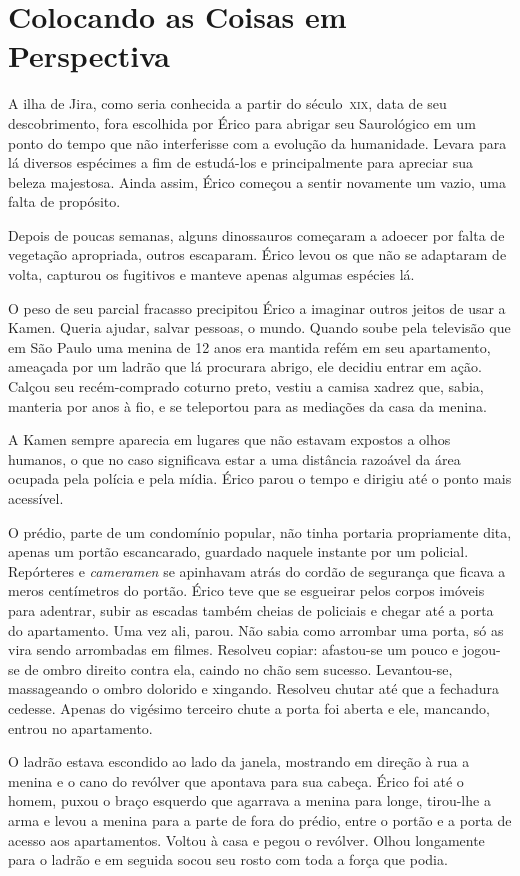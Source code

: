 \chapter{Colocando as Coisas em Perspectiva}

A ilha de Jira, como seria conhecida a partir do século~\textsc{xix}, data de
seu descobrimento, fora escolhida por Érico para abrigar seu Saurológico em um
ponto do tempo que não interferisse com a evolução da humanidade. Levara para
lá diversos espécimes a fim de estudá-los e principalmente para apreciar sua
beleza majestosa. Ainda assim, Érico começou a sentir novamente um vazio, uma
falta de propósito.

Depois de poucas semanas, alguns dinossauros começaram a adoecer por falta de
vegetação apropriada, outros escaparam. Érico levou os que não se adaptaram de
volta, capturou os fugitivos e manteve apenas algumas espécies lá.

O peso de seu parcial fracasso precipitou Érico a imaginar outros jeitos de
usar a Kamen. Queria ajudar, salvar pessoas, o mundo. Quando soube pela
televisão que em São Paulo uma menina de 12 anos era mantida refém em seu
apartamento, ameaçada por um ladrão que lá procurara abrigo, ele decidiu entrar
em ação. Calçou seu recém-comprado coturno preto, vestiu a camisa xadrez que,
sabia, manteria por anos à fio, e se teleportou para as mediações da casa da
menina.

A Kamen sempre aparecia em lugares que não estavam expostos a olhos humanos, o
que no caso significava estar a uma distância razoável da área ocupada pela
polícia e pela mídia. Érico parou o tempo e dirigiu até o ponto mais acessível.

O prédio, parte de um condomínio popular, não tinha portaria propriamente dita,
apenas um portão escancarado, guardado naquele instante por um policial.
Repórteres e \textit{cameramen} se apinhavam atrás do cordão de segurança que
ficava a meros centímetros do portão. Érico teve que se esgueirar pelos corpos
imóveis para adentrar, subir as escadas também cheias de policiais e chegar até
a porta do apartamento. Uma vez ali, parou. Não sabia como arrombar uma porta,
só as vira sendo arrombadas em filmes. Resolveu copiar: afastou-se um pouco e
jogou-se de ombro direito contra ela, caindo no chão sem sucesso. Levantou-se,
massageando o ombro dolorido e xingando. Resolveu chutar até que a fechadura
cedesse. Apenas do vigésimo terceiro chute a porta foi aberta e ele, mancando,
entrou no apartamento.

O ladrão estava escondido ao lado da janela, mostrando em direção à rua a
menina e o cano do revólver que apontava para sua cabeça. Érico foi até o
homem, puxou o braço esquerdo que agarrava a menina para longe, tirou-lhe a
arma e levou a menina para a parte de fora do prédio, entre o portão e a porta
de acesso aos apartamentos. Voltou à casa e pegou o revólver. Olhou longamente
para o ladrão e em seguida socou seu rosto com toda a força que podia.

